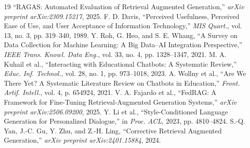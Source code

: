 \documentclass[conference]{IEEEtran}
\begin{document}
\begin{thebibliography}{19}
``RAGAS: Automated Evaluation of Retrieval Augmented Generation,''
\textit{arXiv preprint arXiv:2309.15217}, 2025.
F. D. Davis, ``Perceived Usefulness, Perceived Ease of Use, and User
Acceptance of Information Technology,'' \textit{MIS Quart.}, vol. 13,
no. 3, pp. 319--340, 1989.
Y. Roh, G. Heo, and S. E. Whang, ``A Survey on Data Collection for
Machine Learning: A Big Data--AI Integration Perspective,''
\textit{IEEE Trans. Knowl. Data Eng.}, vol. 33, no. 4,
pp. 1328--1347, 2021.
M. A. Kuhail et al., ``Interacting with Educational Chatbots: A
Systematic Review,'' \textit{Educ. Inf. Technol.}, vol. 28, no. 1,
pp. 973--1018, 2023.
A. Wollny et al., ``Are We There Yet? A Systematic Literature Review on
Chatbots in Education,'' \textit{Front. Artif. Intell.}, vol. 4,
p. 654924, 2021.
V. A. Fajardo et al., ``FedRAG: A Framework for Fine-Tuning
Retrieval-Augmented Generation Systems,''
\textit{arXiv preprint arXiv:2506.09200}, 2025.
Y. Li et al., ``Style-Conditioned Language Generation for Personalized
Dialogue,'' in \textit{Proc. ACL}, 2023, pp. 4810--4824.
S.-Q. Yan, J.-C. Gu, Y. Zhu, and Z.-H. Ling, ``Corrective Retrieval
Augmented Generation,'' \textit{arXiv preprint arXiv:2401.15884}, 2024.
\end{thebibliography}
\end{document}
